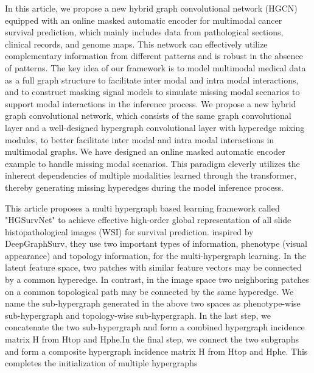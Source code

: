 \documentclass[journal,twoside,web]{ieeecolor}
\begin{document}


In this article, we propose a new hybrid graph convolutional network (HGCN) \cite{hou2023hybrid}equipped with an online masked automatic encoder for multimodal cancer survival prediction, which mainly includes data from pathological sections, clinical records, and genome maps. This network can effectively utilize complementary information from different patterns and is robust in the absence of patterns. The key idea of our framework is to model multimodal medical data as a full graph structure to facilitate inter modal and intra modal interactions, and to construct masking signal models to simulate missing modal scenarios to support modal interactions in the inference process. We propose a new hybrid graph convolutional network, which consists of the same graph convolutional layer and a well-designed hypergraph convolutional layer with hyperedge mixing modules, to better facilitate inter modal and intra modal interactions in multimodal graphs. We have designed an online masked automatic encoder example to handle missing modal scenarios. This paradigm cleverly utilizes the inherent dependencies of multiple modalities learned through the transformer, thereby generating missing hyperedges during the model inference process.



This article proposes a multi hypergraph based learning framework called "HGSurvNet" \cite{di2022generating}to achieve effective high-order global representation of all slide histopathological images (WSI) for survival prediction. inspired by DeepGraphSurv, they use two important types of information, phenotype (visual appearance) and topology information, for the multi-hypergraph learning. In the latent feature space, two patches with similar feature vectors may be connected by a common hyperedge. In contrast, in the image space two neighboring patches on a common topological path may be connected by the same hyperedge. We name the sub-hypergraph generated in the above two spaces as phenotype-wise sub-hypergraph and topology-wise sub-hypergraph. In the last step, we concatenate the two sub-hypergraph and form a combined hypergraph incidence matrix H from Htop and Hphe.In the final step, we connect the two subgraphs and form a composite hypergraph incidence matrix H from Htop and Hphe. This completes the initialization of multiple hypergraphs
\end{document}
